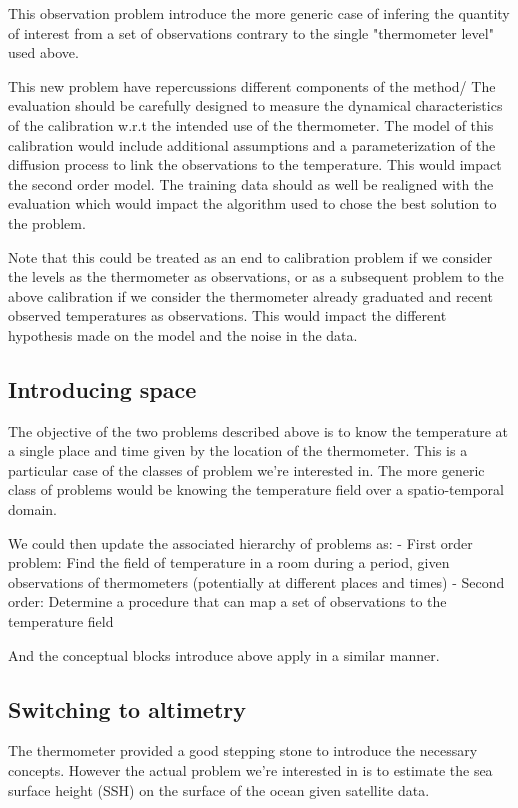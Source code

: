 \begin{bibunit}
This observation problem introduce the more generic case of infering the quantity of interest from a set of observations contrary to the single "thermometer level" used above.

This new problem have repercussions different components of the method/
The evaluation should be carefully designed to measure the dynamical characteristics of the calibration w.r.t the intended use of the thermometer.
The model of this calibration would include additional assumptions and a parameterization of the diffusion process to link the observations to the temperature. This would impact the second order model.
The training data should as well be realigned with the evaluation which would impact the algorithm used to chose the best solution to the problem.

Note that this could be treated as an end to calibration problem if we consider the levels as the thermometer as observations, or as a subsequent problem to the above calibration if we consider the thermometer already graduated and recent observed temperatures as observations. This would impact the different hypothesis made on the model and the noise in the data.


\subsection{Introducing space}
  The objective of the two problems described above is to know the temperature at a single place and time given by the location of the thermometer. 
  This is a particular case of the classes of problem we're interested in.
  The more generic class of problems would be knowing the temperature field over a spatio-temporal domain.

We could then update the associated hierarchy of problems as:
  - First order problem: Find the field of temperature in a room during a period, given observations of thermometers (potentially at different places and times)
  - Second order: Determine a procedure that can map a set of observations to the temperature field

And the conceptual blocks introduce above apply in a similar manner.

\subsection{Switching to altimetry}
  The thermometer provided a good stepping stone to introduce the necessary concepts.
  However the actual problem we're interested in is to estimate the sea surface height (SSH) on the surface of the ocean given satellite data.


\end{bibunit}
